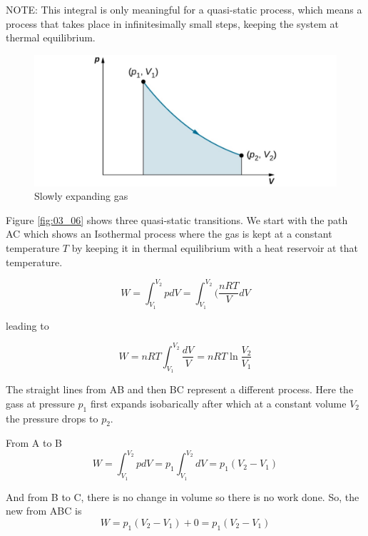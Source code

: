 \documentclass[14pt]{memoir}
\begin{document}
NOTE: This integral is only meaningful for a quasi-static process, which means a process that takes place in infinitesimally small steps, keeping the system at thermal equilibrium.

\begin{figure}[H]
\begin{center}
\includegraphics[scale=.6]{fig/fig_03_05.jpg}
\caption{Slowly expanding gas}
\label{fig:03_05}
\end{center}
\end{figure}

Figure \ref{fig:03_06} shows three quasi-static  transitions. We start with the path AC which  shows an Isothermal process where the gas is kept at a constant temperature $T$ by keeping it in thermal equilibrium with a heat reservoir at that temperature.

\begin{equation}
W = \int_{V_1}^{V_2} pdV = \int_{V_1}^{V_2} (\frac{nRT}{V}dV
\end{equation}

leading to

\begin{equation}
W = nRT \int_{V_1}^{V_2} \frac{dV}{V} = nRT \ln{\frac{V_2}{V_1}}
\label{eq:tde1}
\end{equation}

The straight lines from AB and then BC represent a different process. Here the gass at pressure $p_1$ first expands isobarically after which at a constant volume $V_2$ the pressure drops to $p_2$. 

From A to B
\begin{equation}
W = \int_{V_1}^{V_2} p dV = p_1 \int_{V_1}^{V_2} dV = p_1 ( V_2 - V_1)
\end{equation}

And from B to C, there is no change in volume so there is no work done. So, the new from ABC is
\begin{equation}
W = p_1 ( V_2 - V_1) + 0 = p_1 ( V_2 - V_1)
\label{eq:tde2}
\end{equation}
\end{document}
